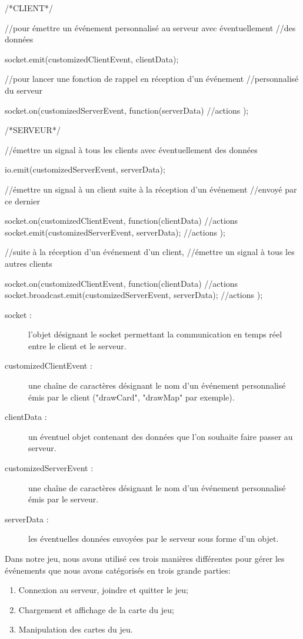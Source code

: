 \documentclass[12pt]{report}
\begin{document}
	\begin{verbatimtab}[4]
	/*CLIENT*/

	//pour émettre un événement personnalisé au serveur avec éventuellement
	//des données

	socket.emit(customizedClientEvent, clientData);

	//pour lancer une fonction de rappel en réception d'un événement
	//personnalisé du serveur

	socket.on(customizedServerEvent, function(serverData){
		//actions
	});

	/*SERVEUR*/

	//émettre un signal à tous les clients avec éventuellement des données

	io.emit(customizedServerEvent, serverData);

	//émettre un signal à un client suite à la réception d'un événement
	//envoyé par ce dernier

	socket.on(customizedClientEvent, function(clientData){
		//actions
		socket.emit(customizedServerEvent, serverData);
		//actions
	});

	//suite à la réception d'un événement d'un client,
	//émettre un signal à tous les autres clients

	socket.on(customizedClientEvent, function(clientData){
		//actions
		socket.broadcast.emit(customizedServerEvent, serverData);
		//actions
	});
	\end{verbatimtab}

	\begin{description}
		\item [socket :]{
			l'objet désignant le socket permettant la communication en temps réel entre le client et le serveur.
		}
		\item [customizedClientEvent :]{
			une chaîne de caractères désignant le nom d'un événement personnalisé émis par le client ("drawCard", "drawMap" par exemple).
		}
		\item [clientData :]{
			un éventuel objet contenant des données que l'on souhaite faire passer au serveur.
		}
		\item [customizedServerEvent :]{
			une chaîne de caractères désignant le nom d'un événement personnalisé émis par le serveur.
		}
		\item [serverData :]{
			les éventuelles données envoyées par le serveur sous forme d'un objet.
		}
	\end{description}

	Dans notre jeu, nous avons utilisé ces trois manières différentes pour gérer les événements que nous avons catégorisés en trois grande parties:
	\begin{enumerate}
		\item{Connexion au serveur, joindre et quitter le jeu;}
		\item{Chargement et affichage de la carte du jeu;}
		\item{Manipulation des cartes du jeu.}
	\end{enumerate}
\end{document}
